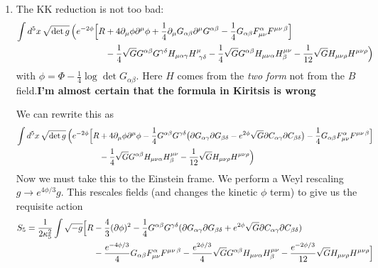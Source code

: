 \documentclass[11pt, class=article, crop=false]{standalone}
\begin{document}
\begin{enumerate}
\begin{enumerate}
		Looking at the $N_{\perp}^2$ and $N_\phi^2$ contributions to $g_{00}$ we get:
		\[
			-g_{00} = - \frac{r_-^2 + r_+^2}{l^2}   + \frac{r^2}{l^2}
		\]
		This is a black hole in AdS with mass $M = \frac{r_-^2 + r_+^2}{l^2}$. Similarly, from the $dt\, d\phi$ component, we see that $2 r^2 N_\phi$ corresponds exactly to the angular momentum. We thus get
		\[
			M = \frac{r_+^2 + r_-^2}{l^2}, \quad J = \frac{2 r_+ r_-}{l}
		\]
		Note for global AdS when $r_-\to 0, r_+^2 \to -l^2$, we get mass $-1$. \textbf{Kiritsis adjusts the definition of mass by $+1$ making it $0$ in global AdS, so that it counts only the mass of the black hole.}
		
		This gives 
		\[
			I_1 = -2 M, \quad  I_2 = 2 J / l
		\]
	\end{enumerate}
	
	\item The KK reduction is not too bad:
	\[
	\begin{aligned}
		\int d^5 x \, \sqrt{\det g} \, \Big(e^{-2\phi} \Big[R &+ 4 \partial_\mu \phi \partial^\mu \phi + \frac14 \partial_\mu G_{\alpha \beta} \partial^\mu G^{\alpha \beta} - \frac14  G_{\alpha \beta} F_{\mu \nu}^\alpha F^{\mu \nu\, \beta} \Big] \\
		& - \frac14 \sqrt{G} G^{\alpha \beta} G^{\gamma \delta} H_{\mu \alpha \gamma} H^\mu_{\ \gamma \delta} - \frac14 \sqrt{G} G^{\alpha \beta} H_{\mu \nu \alpha} H^{\mu \nu}_\beta - \frac{1}{12} \sqrt{G} H_{\mu \nu \rho} H^{\mu \nu \rho}  \Big)
	\end{aligned}
	\]
	with $\phi = \Phi - \frac14 \log \det G_{\alpha \beta}$. 
	Here $H$ comes from the \emph{two form} not from the $B$ field.\textbf{I'm almost certain that the formula in Kiritsis is wrong }
	
	 We can rewrite this as
	\[
	\begin{aligned}
			\int d^5 x \, \sqrt{\det g} \, \Big(e^{-2\phi} \Big[R &+ 4 \partial_\mu \phi \partial^\mu \phi - \frac14 G^{\alpha \beta} G^{\gamma \delta} \big(  \partial G_{\alpha \gamma} \partial G_{\beta \delta} - e^{2\phi} \sqrt{G} \partial C_{\alpha \gamma} \partial C_{\beta \delta}  \big) -  \frac14  G_{\alpha \beta} F_{\mu \nu}^\alpha F^{\mu \nu\, \beta} \Big] \\
			& - \frac14 \sqrt{G} G^{\alpha \beta} H_{\mu \nu \alpha} H^{\mu \nu}_\beta - \frac{1}{12} \sqrt{G} H_{\mu \nu \rho} H^{\mu \nu \rho}  \Big)
		\end{aligned}
	\]
	Now we must take this to the Einstein frame. We perform a Weyl rescaling $g \to e^{4\phi/3} g$. This rescales fields (and changes the kinetic $\phi$ term) to give us the requisite action
	\[
	\begin{aligned}
		S_5 = \frac{1}{2 \kappa_5^2} \int \sqrt{-g} \Big[R &- \frac43 (\partial \phi)^2 - \frac14 G^{\alpha \beta} G^{\gamma \delta} (\partial G_{\alpha \gamma} \partial G_{\beta \delta} + e^{2\phi} \sqrt{G} \partial C_{\alpha \gamma} \partial C_{\beta \delta})\\
		& - \frac{e^{-4 \phi/3}}{4} G_{\alpha \beta} F_{\mu \nu}^\alpha F^{\mu \nu\, \beta} - \frac{e^{2\phi /3}}{4} \sqrt{G} G^{\alpha \beta} H_{\mu \nu \alpha} H^{\mu \nu}_\beta - \frac{e^{-2 \phi/3}}{12} \sqrt{G} H_{\mu \nu \rho} H^{\mu \nu \rho}  \Big]
	\end{aligned}
	\]
	

\end{enumerate}
\end{document}

